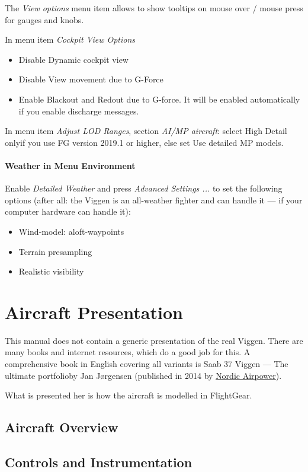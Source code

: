 The \emph{View options} menu item allows to show tooltips on mouse over / mouse press for gauges and knobs.

In menu item \emph{Cockpit View Options}
\begin{itemize}
\item Disable \glqq Dynamic cockpit view \grqq
\item Disable \glqq View movement due to G-Force\grqq
\item Enable \glqq Blackout and Redout due to G-force\grqq. It will be enabled automatically if you enable discharge messages.
\end{itemize}

In menu item \emph{Adjust LOD Ranges}, section \emph{AI/MP aircraft}: select \glqq High Detail only\grqq if you use FG version 2019.1 or higher, else set \glqq Use detailed MP models\grqq.

\subsection{Weather in Menu Environment}
Enable \emph{Detailed Weather} and press \emph{Advanced Settings ...} to set the following options (after all: the Viggen is an all-weather fighter and can handle it --- if your computer hardware can handle it):
\begin{itemize}
\item Wind-model: aloft-waypoints
\item Terrain presampling
\item Realistic visibility
\end{itemize}

\part{Aircraft Presentation}
This manual does not contain a generic presentation of the real Viggen. There are many books and internet resources, which do a good job for this. A comprehensive book in English covering all variants is \glqq Saab 37 Viggen --- The ultimate portfolio\grqq by Jan Jørgensen (published in 2014 by \href{http://www.nordicairpower.com/}{Nordic Airpower}).

What is presented her is how the aircraft is modelled in FlightGear.

\chapter{Aircraft Overview}
\chapter{Controls and Instrumentation}
